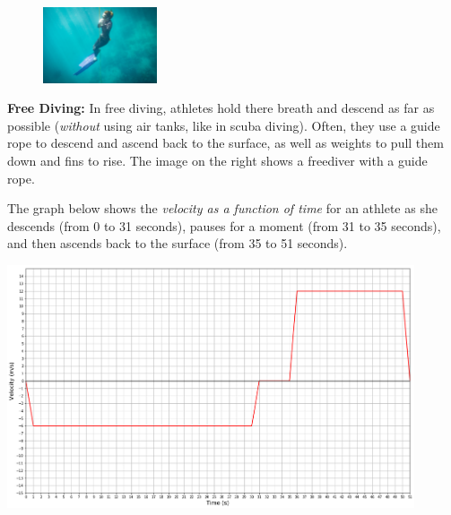 \documentclass[addpoints,12pt]{exam}
\begin{document}
\begin{questions}
\begin{minipage}{\linewidth}
\begin{figure}
	\vspace{-20pt}
	\begin{center}\includegraphics[width=0.3\textwidth]{../images/freediving.jpg}\end{center}
	\vspace{-20pt}
\end{figure}
\question \textbf{Free Diving:} In free diving, athletes hold there breath and descend as far as possible (\textit{without} using air tanks, like in scuba diving). Often, they use a guide rope to descend and ascend back to the surface, as well as weights to pull them down and fins to rise. The image on the right shows a freediver with a guide rope.

The graph below shows the \textit{velocity as a function of time} for an athlete as she descends (from 0 to 31 seconds), pauses for a moment (from 31 to 35 seconds), and then ascends back to the surface (from 35 to 51 seconds).

\begin{center}
\includegraphics[width=0.9\textwidth]{../images/test1V2_freeDiving.png}
\end{center}

\end{minipage}
\end{questions}
\end{document}
